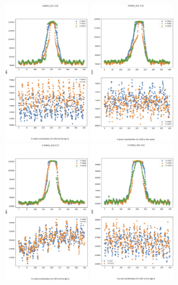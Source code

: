 \begin{figure}[ht]
\centering
\includegraphics[width=0.33\textwidth]{figures/ITLDip_Spot_Cutout.png}
\includegraphics[width=0.33\textwidth]{figures/ITLDip_Spot_Cutout2.png} \\
\includegraphics[width=0.33\textwidth]{figures/ITLDip_Spot_Cutout3.png}
\includegraphics[width=0.33\textwidth]{figures/ITLDip_Spot_Cutout4.png}

\end{figure}

